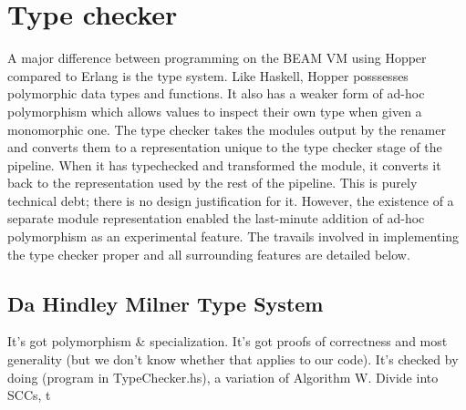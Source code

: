 \section{Type checker}

A major difference between programming on the BEAM VM using Hopper compared to Erlang is the type system. Like Haskell, Hopper posssesses polymorphic data types and functions. It also has a weaker form of ad-hoc polymorphism which allows values to inspect their own type when given a monomorphic one. 
The type checker takes the modules output by the renamer and converts them to a representation unique to the type checker stage of the pipeline. When it has typechecked and transformed the module, it converts it back to the representation used by the rest of the pipeline. This is purely technical debt; there is no design justification for it. However, the existence of a separate module representation enabled the last-minute addition of ad-hoc polymorphism as an experimental feature. The travails involved in implementing the type checker proper and all surrounding features are detailed below.

\subsection{Da Hindley Milner Type System}

It's got polymorphism \& specialization. It's got proofs of correctness and most generality (but we don't know whether that applies to our code). It's checked by doing (program in TypeChecker.hs), a variation of Algorithm W.
Divide into SCCs, t




